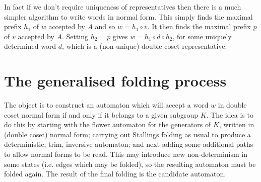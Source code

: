 \documentclass[a4paper,12pt]{article}
\newtheorem{exam}[theorem]{Example}
\newenvironment{example}{\begin{exam} \rm}{\end{exam}}
\numberwithin{equation}{section}
\numberwithin{figure}{section}
\begin{document}
In fact if we don't require uniqueness of representatives then there is
a much simpler algorithm to write words in normal form.
This
simply finds the maximal prefix $h_1$ of $w$  accepted  by $A$  and so $w=h_1\circ v$. It then finds the
maximal prefix $p$ of $\bar v$ accepted by $A$. Setting $h_2=\bar p$ gives $w=h_1\circ d \circ h_2$, for
some uniquely determined word $d$, which is a (non-unique)
double coset representative.



%
%
\section{The generalised folding process}\label{sec:foldings}
The object is to construct an automaton which will accept a word
$w$ in double coset normal form if and only if it belongs to a
given subgroup $K$. The idea is to do this by starting with the
flower automaton for the generators of $K$, written in (double
coset) normal form; carrying out Stallings folding as usual to
produce a deterministic, trim, inversive automaton; and next
adding some additional paths to allow normal forms to be read.
This may introduce new non-determinism in some  states (i.e. edges
which may be folded), so the resulting automaton must be folded
again. The result of the final folding is the candidate automaton.
\end{document}
